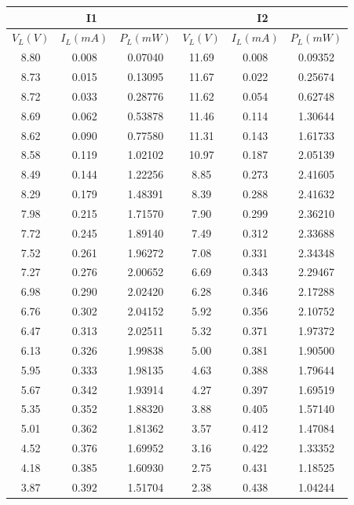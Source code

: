 \documentclass[12pt]{article}
\begin{document}
\begin{center}
 \begin{tabular}{||c c c||c c c||} 
 \hline
 \multicolumn{3}{||c||}{I1} & \multicolumn{3}{|c||}{I2}\\
 \hline
  \( V_L (V) \) & \( I_L (mA) \) & \( P_L (mW) \) & \( V_L (V) \) & \( I_L (mA) \) & \( P_L (mW) \) \\ [0.25ex] 
 \hline
 \hline 
8.80 & 0.008 & 0.07040 & 11.69 & 0.008 & 0.09352 \\ \hline
8.73 & 0.015 & 0.13095 & 11.67 & 0.022 & 0.25674 \\ \hline
8.72 & 0.033 & 0.28776 & 11.62 & 0.054 & 0.62748 \\ \hline
8.69 & 0.062 & 0.53878 & 11.46 & 0.114 & 1.30644 \\ \hline
8.62 & 0.090 & 0.77580 & 11.31 & 0.143 & 1.61733 \\ \hline
8.58 & 0.119 & 1.02102 & 10.97 & 0.187 & 2.05139 \\ \hline
8.49 & 0.144 & 1.22256 & 8.85 & 0.273 & 2.41605 \\ \hline
8.29 & 0.179 & 1.48391 & 8.39 & 0.288 & 2.41632 \\ \hline
7.98 & 0.215 & 1.71570 & 7.90 & 0.299 & 2.36210 \\ \hline
7.72 & 0.245 & 1.89140 & 7.49 & 0.312 & 2.33688 \\ \hline
7.52 & 0.261 & 1.96272 & 7.08 & 0.331 & 2.34348 \\ \hline
7.27 & 0.276 & 2.00652 & 6.69 & 0.343 & 2.29467 \\ \hline
6.98 & 0.290 & 2.02420 & 6.28 & 0.346 & 2.17288 \\ \hline
6.76 & 0.302 & 2.04152 & 5.92 & 0.356 & 2.10752 \\ \hline
6.47 & 0.313 & 2.02511 & 5.32 & 0.371 & 1.97372 \\ \hline
6.13 & 0.326 & 1.99838 & 5.00 & 0.381 & 1.90500 \\ \hline
5.95 & 0.333 & 1.98135 & 4.63 & 0.388 & 1.79644 \\ \hline
5.67 & 0.342 & 1.93914 & 4.27 & 0.397 & 1.69519 \\ \hline
5.35 & 0.352 & 1.88320 & 3.88 & 0.405 & 1.57140 \\ \hline
5.01 & 0.362 & 1.81362 & 3.57 & 0.412 & 1.47084 \\ \hline
4.52 & 0.376 & 1.69952 & 3.16 & 0.422 & 1.33352 \\ \hline
4.18 & 0.385 & 1.60930 & 2.75 & 0.431 & 1.18525 \\ \hline
3.87 & 0.392 & 1.51704 & 2.38 & 0.438 & 1.04244 \\ \hline

\end{tabular}
\end{center}
\end{document}
